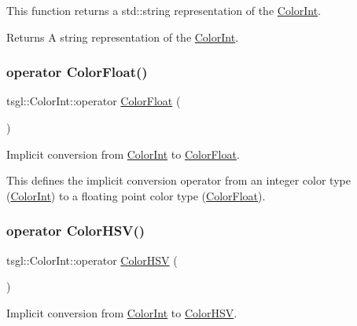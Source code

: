 This function returns a std\+::string representation of the \hyperlink{structtsgl_1_1_color_int}{Color\+Int}. \begin{DoxyReturn}{Returns}
A string representation of the \hyperlink{structtsgl_1_1_color_int}{Color\+Int}. 
\end{DoxyReturn}
\mbox{\label{structtsgl_1_1_color_int_a34855245876c1ccee51625086f671ebf}} 
\subsubsection{\texorpdfstring{operator Color\+Float()}{operator ColorFloat()}}
{\footnotesize\ttfamily tsgl\+::\+Color\+Int\+::operator \hyperlink{structtsgl_1_1_color_float}{Color\+Float} (\begin{DoxyParamCaption}{ }\end{DoxyParamCaption})}



Implicit conversion from \hyperlink{structtsgl_1_1_color_int}{Color\+Int} to \hyperlink{structtsgl_1_1_color_float}{Color\+Float}. 

This defines the implicit conversion operator from an integer color type (\hyperlink{structtsgl_1_1_color_int}{Color\+Int}) to a floating point color type (\hyperlink{structtsgl_1_1_color_float}{Color\+Float}). \mbox{\label{structtsgl_1_1_color_int_acbd82ad2c6388389aa3474f042a25353}} 
\subsubsection{\texorpdfstring{operator Color\+H\+S\+V()}{operator ColorHSV()}}
{\footnotesize\ttfamily tsgl\+::\+Color\+Int\+::operator \hyperlink{structtsgl_1_1_color_h_s_v}{Color\+H\+SV} (\begin{DoxyParamCaption}{ }\end{DoxyParamCaption})}



Implicit conversion from \hyperlink{structtsgl_1_1_color_int}{Color\+Int} to \hyperlink{structtsgl_1_1_color_h_s_v}{Color\+H\+SV}. 

